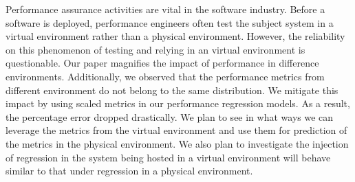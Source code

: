 Performance assurance activities are vital in the software industry. Before a software is deployed, performance engineers often test the subject system in a virtual environment rather than a physical environment. However, the reliability on this phenomenon of testing and relying in an virtual environment is questionable. Our paper magnifies the impact of performance in difference environments. Additionally, we observed that the performance metrics from different environment do not belong to the same distribution. We mitigate this impact by using scaled metrics in our performance regression models. As a result, the percentage error dropped drastically. We plan to see in what ways we can leverage the metrics from the virtual environment and use them for prediction of the metrics in the physical environment. We also plan to investigate the injection of regression in the system being hosted in a virtual environment will behave similar to that under regression in a physical environment. 